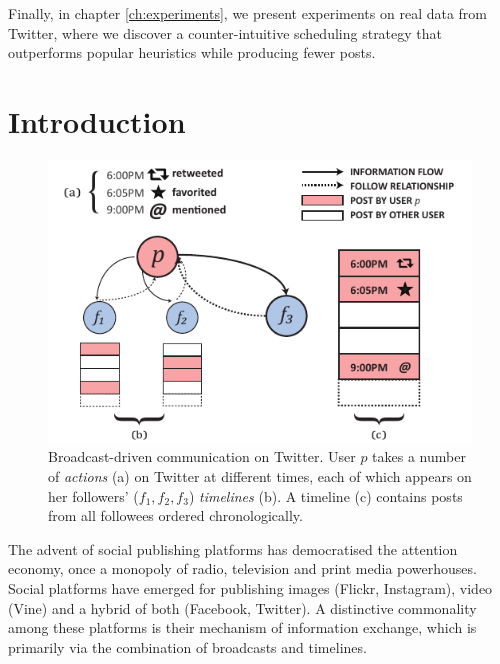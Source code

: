 \documentclass[onesided,letterpaper]{tufte-book}
\begin{document}
Finally, in chapter \ref{ch:experiments}, we present experiments on real data from Twitter, where we discover a counter-intuitive scheduling strategy that outperforms popular heuristics while producing fewer posts.



\setlength{\parskip}{-3pc}
\tableofcontents
\setlength{\parskip}{\baselineskip}

\listoffigures

\listoftables

\mainmatter

\chapter{Introduction}

\begin{figure}%
  \includegraphics[width=\linewidth]{broadcasts}
  \caption[Broadcast-driven communication on Twitter.]{Broadcast-driven communication on Twitter. User $p$ takes a number of \textit{actions} (a) on Twitter at different times, each of which appears on her followers' ($f_1, f_2, f_3$) \textit{timelines} (b). A timeline (c) contains posts from all followees ordered chronologically.}
  \label{fig:broadcasts}
\end{figure}

The advent of social publishing platforms has democratised the attention economy, once a monopoly of radio, television and print media powerhouses. Social platforms have emerged for publishing images (Flickr, Instagram), video (Vine) and a hybrid of both (Facebook, Twitter). A distinctive commonality among these platforms is their mechanism of information exchange, which is primarily via the combination of broadcasts and timelines.
\end{document}
